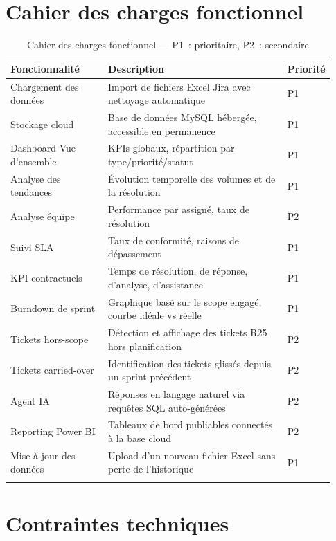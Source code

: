 \documentclass[12pt, a4paper]{report}
\begin{document}
\section{Cahier des charges fonctionnel}

\begin{longtable}{p{0.3\linewidth} p{0.55\linewidth} p{0.08\linewidth}}
    \toprule
    \textbf{Fonctionnalité} & \textbf{Description} & \textbf{Priorité} \\
    \midrule
    \endhead
    Chargement des données & Import de fichiers Excel Jira avec nettoyage automatique & P1 \\
    \midrule
    Stockage cloud & Base de données MySQL hébergée, accessible en permanence & P1 \\
    \midrule
    Dashboard Vue d'ensemble & KPIs globaux, répartition par type/priorité/statut & P1 \\
    \midrule
    Analyse des tendances & Évolution temporelle des volumes et de la résolution & P1 \\
    \midrule
    Analyse équipe & Performance par assigné, taux de résolution & P2 \\
    \midrule
    Suivi SLA & Taux de conformité, raisons de dépassement & P1 \\
    \midrule
    KPI contractuels & Temps de résolution, de réponse, d'analyse, d'assistance & P1 \\
    \midrule
    Burndown de sprint & Graphique basé sur le scope engagé, courbe idéale vs réelle & P1 \\
    \midrule
    Tickets hors-scope & Détection et affichage des tickets R25 hors planification & P2 \\
    \midrule
    Tickets carried-over & Identification des tickets glissés depuis un sprint précédent & P2 \\
    \midrule
    Agent IA & Réponses en langage naturel via requêtes SQL auto-générées & P2 \\
    \midrule
    Reporting Power BI & Tableaux de bord publiables connectés à la base cloud & P2 \\
    \midrule
    Mise à jour des données & Upload d'un nouveau fichier Excel sans perte de l'historique & P1 \\
    \bottomrule
    \caption{Cahier des charges fonctionnel — P1~: prioritaire, P2~: secondaire}
\end{longtable}

\section{Contraintes techniques}
\end{document}
